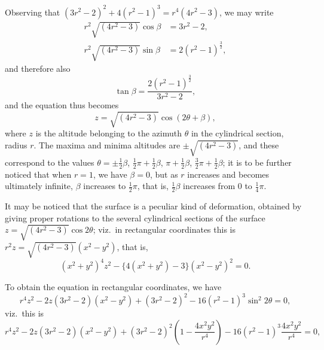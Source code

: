 \documentclass[11pt,a4paper]{article}
\begin{document}
Observing that $(3r^2 - 2)^2 + 4(r^2 - 1)^3 = r^4 (4r^2 - 3)$, we may write
\begin{align*}
r^2 \sqrt{(4r^2 - 3)}\cos\beta &= 3r^2 - 2, \\
r^2 \sqrt{(4r^2 - 3)}\sin\beta &= 2(r^2 - 1)^{\tfrac{3}{2}},
\end{align*}
and therefore also
\[
\tan\beta = \frac{2(r^2 - 1)^{\tfrac{3}{2}}}{3r^2 - 2},
\]
and the equation thus becomes
\[
z = \sqrt{(4r^2 - 3)}\cos(2\theta + \beta),
\]
where $z$ is the altitude belonging to the azimuth $\theta$ in the cylindrical section, radius $r$. The maxima and minima altitudes are $\pm\sqrt{(4r^2 - 3)}$, and these correspond to the values $\theta = \pm\tfrac{1}{2}\beta$, $\tfrac{1}{2}\pi + \tfrac{1}{2}\beta$, $\pi + \tfrac{1}{2}\beta$, $\tfrac{3}{2}\pi + \tfrac{1}{2}\beta$; it is to be further noticed that when $r = 1$, we have $\beta = 0$, but as $r$ increases and becomes ultimately infinite, $\beta$ increases to $\tfrac{1}{2}\pi$, that is, $\tfrac{1}{2}\beta$ increases from $0$ to $\tfrac{1}{4}\pi$.

It may be noticed that the surface is a peculiar kind of deformation, obtained by giving proper rotations to the several cylindrical sections of the surface $z = \sqrt{(4r^2 - 3)}\cos 2\theta$; viz.\ in rectangular coordinates this is $r^2 z = \sqrt{(4r^2 - 3)} (x^2 - y^2)$, that is,
\[
(x^2 + y^2)^4 z^2 - \{4(x^2 + y^2) - 3\}(x^2 - y^2)^2 = 0.
\]

To obtain the equation in rectangular coordinates, we have
\[
r^4 z^2 - 2z (3r^2 - 2)(x^2 - y^2) + (3r^2 - 2)^2 - 16(r^2 - 1)^3 \sin^2 2\theta = 0,
\]
viz.\ this is
\[
r^4 z^2 - 2z(3r^2 - 2)(x^2 - y^2) + (3r^2 - 2)^2 \left(1 - \frac{4x^2 y^2}{r^4}\right) - 16(r^2 - 1)^3 \frac{4x^2 y^2}{r^4} = 0,
\]

\bigskip
\end{document}
